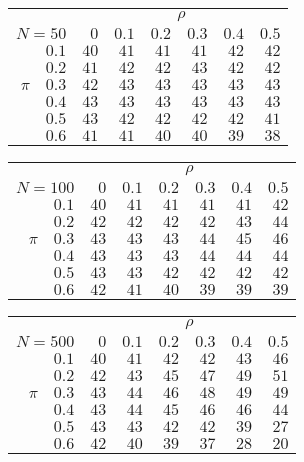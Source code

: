 \begin{tabular}{r|rrrrrr}
\hline\hline
 &\multicolumn{6}{c}{$\rho$} \\ 
 $N = 50$ & $0$ & $0.1$ & $0.2$ & $0.3$ & $0.4$ & $0.5$ \\ 
 \hline$0.1$ & $40$ & $41$ & $41$ & $41$ & $42$ & $42$\\ 
$0.2$ & $41$ & $42$ & $42$ & $43$ & $42$ & $42$\\ 
$\pi\quad$$0.3$ & $42$ & $43$ & $43$ & $43$ & $43$ & $43$\\ 
$0.4$ & $43$ & $43$ & $43$ & $43$ & $43$ & $43$\\ 
$0.5$ & $43$ & $42$ & $42$ & $42$ & $42$ & $41$\\ 
$0.6$ & $41$ & $41$ & $40$ & $40$ & $39$ & $38$\\ 
 \hline 
 \end{tabular}
 
 \vspace{2em} 
 
\begin{tabular}{r|rrrrrr}
\hline\hline
 &\multicolumn{6}{c}{$\rho$} \\ 
 $N = 100$ & $0$ & $0.1$ & $0.2$ & $0.3$ & $0.4$ & $0.5$ \\ 
 \hline$0.1$ & $40$ & $41$ & $41$ & $41$ & $41$ & $42$\\ 
$0.2$ & $42$ & $42$ & $42$ & $42$ & $43$ & $44$\\ 
$\pi\quad$$0.3$ & $43$ & $43$ & $43$ & $44$ & $45$ & $46$\\ 
$0.4$ & $43$ & $43$ & $43$ & $44$ & $44$ & $44$\\ 
$0.5$ & $43$ & $43$ & $42$ & $42$ & $42$ & $42$\\ 
$0.6$ & $42$ & $41$ & $40$ & $39$ & $39$ & $39$\\ 
 \hline 
 \end{tabular}
 
 \vspace{2em} 
 
\begin{tabular}{r|rrrrrr}
\hline\hline
 &\multicolumn{6}{c}{$\rho$} \\ 
 $N = 500$ & $0$ & $0.1$ & $0.2$ & $0.3$ & $0.4$ & $0.5$ \\ 
 \hline$0.1$ & $40$ & $41$ & $42$ & $42$ & $43$ & $46$\\ 
$0.2$ & $42$ & $43$ & $45$ & $47$ & $49$ & $51$\\ 
$\pi\quad$$0.3$ & $43$ & $44$ & $46$ & $48$ & $49$ & $49$\\ 
$0.4$ & $43$ & $44$ & $45$ & $46$ & $46$ & $44$\\ 
$0.5$ & $43$ & $43$ & $42$ & $42$ & $39$ & $27$\\ 
$0.6$ & $42$ & $40$ & $39$ & $37$ & $28$ & $20$\\ 
 \hline 
 \end{tabular}